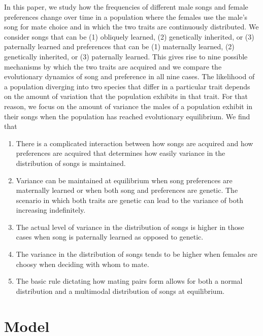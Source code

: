 \documentclass[12pt]{article}
\begin{document}
In this paper, we study how the frequencies of different male songs and female preferences change over time in a population where the females use the male's song for mate choice and in which the two traits are continuously distributed. We consider songs that can be (1) obliquely learned, (2) genetically inherited, or (3) paternally learned and preferences that can be (1) maternally learned, (2) genetically inherited, or (3) paternally learned. This gives rise to nine possible mechanisms by which the two traits are acquired and we compare the evolutionary dynamics of song and preference in all nine cases. The likelihood of a population diverging into two species that differ in a particular trait depends on the amount of variation that the population exhibits in that trait. For that reason, we focus on the amount of variance the males of a population exhibit in their songs when the population has reached evolutionary equilibrium. 
We find that 
\begin{enumerate}
\item There is a complicated interaction between how songs are acquired and how preferences are acquired that determines how easily variance in the distribution of songs is maintained.
\item Variance can be maintained at equilibrium when song preferences are maternally learned or when both song and preferences are genetic. The scenario in which both traits are genetic can lead to the variance of both increasing indefinitely.
\item The actual level of variance in the distribution of songs is higher in those cases when song is paternally learned as opposed to genetic.
\item The variance in the distribution of songs tends to be higher when females are choosy when deciding with whom to mate.
\item The basic rule dictating how mating pairs form allows for both a normal distribution  and a multimodal distribution of songs at equilibrium.
\end{enumerate}

\section*{Model}
\end{document}
